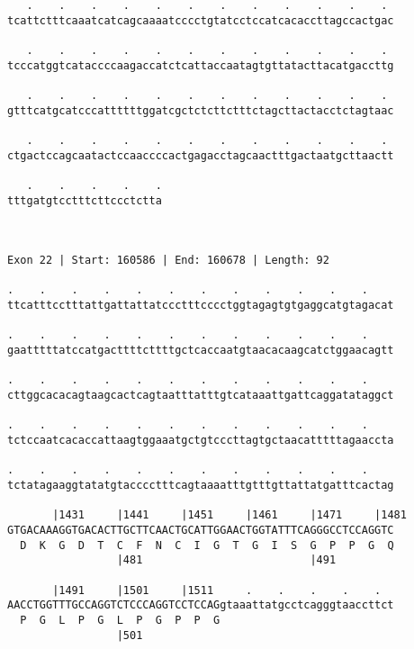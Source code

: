 \documentclass{article}
\begin{document}
\begin{Verbatim}
   .    .    .    .    .    .    .    .    .    .    .    . 
tcattctttcaaatcatcagcaaaatcccctgtatcctccatcacaccttagccactgac
                                                            
   .    .    .    .    .    .    .    .    .    .    .    . 
tcccatggtcataccccaagaccatctcattaccaatagtgttatacttacatgaccttg
                                                            
   .    .    .    .    .    .    .    .    .    .    .    . 
gtttcatgcatcccattttttggatcgctctcttctttctagcttactacctctagtaac
                                                            
   .    .    .    .    .    .    .    .    .    .    .    . 
ctgactccagcaatactccaaccccactgagacctagcaactttgactaatgcttaactt
                                                            
   .    .    .    .    .
tttgatgtcctttcttccctctta
                        
                        
 
Exon 22 | Start: 160586 | End: 160678 | Length: 92
 
.    .    .    .    .    .    .    .    .    .    .    .    
ttcatttcctttattgattattatccctttcccctggtagagtgtgaggcatgtagacat
                                                            
.    .    .    .    .    .    .    .    .    .    .    .    
gaatttttatccatgacttttcttttgctcaccaatgtaacacaagcatctggaacagtt
                                                            
.    .    .    .    .    .    .    .    .    .    .    .    
cttggcacacagtaagcactcagtaatttatttgtcataaattgattcaggatataggct
                                                            
.    .    .    .    .    .    .    .    .    .    .    .    
tctccaatcacaccattaagtggaaatgctgtcccttagtgctaacatttttagaaccta
                                                            
.    .    .    .    .    .    .    .    .    .    .    .    
tctatagaaggtatatgtacccctttcagtaaaatttgtttgttattatgatttcactag
                                                            
       |1431     |1441     |1451     |1461     |1471     |1481
GTGACAAAGGTGACACTTGCTTCAACTGCATTGGAACTGGTATTTCAGGGCCTCCAGGTC
  D  K  G  D  T  C  F  N  C  I  G  T  G  I  S  G  P  P  G  Q
                 |481                          |491         
  
       |1491     |1501     |1511     .    .    .    .    .  
AACCTGGTTTGCCAGGTCTCCCAGGTCCTCCAGgtaaattatgcctcagggtaaccttct
  P  G  L  P  G  L  P  G  P  P  G                           
                 |501                                       
  

\end{Verbatim}
\end{document}

